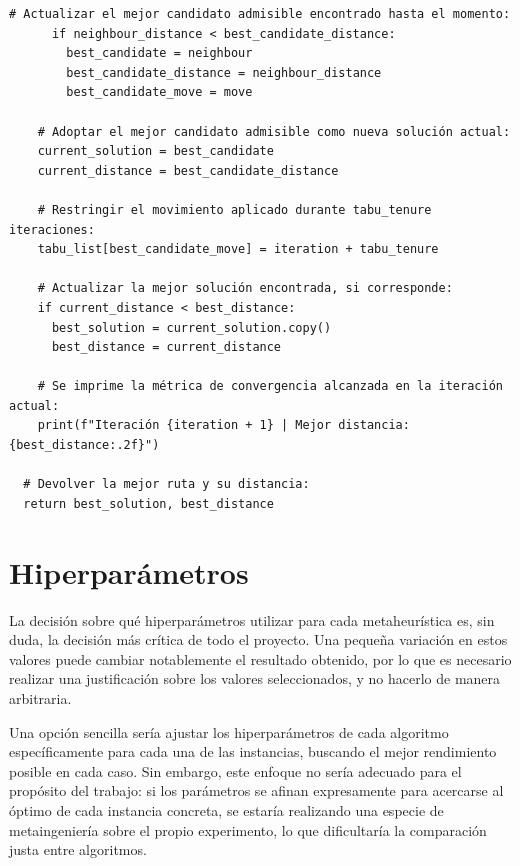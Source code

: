 \begin{lstlisting}[style=PythonStyle]
      # Actualizar el mejor candidato admisible encontrado hasta el momento:
      if neighbour_distance < best_candidate_distance:
        best_candidate = neighbour
        best_candidate_distance = neighbour_distance
        best_candidate_move = move

    # Adoptar el mejor candidato admisible como nueva solución actual:
    current_solution = best_candidate
    current_distance = best_candidate_distance

    # Restringir el movimiento aplicado durante tabu_tenure iteraciones:
    tabu_list[best_candidate_move] = iteration + tabu_tenure

    # Actualizar la mejor solución encontrada, si corresponde:
    if current_distance < best_distance:
      best_solution = current_solution.copy()
      best_distance = current_distance

    # Se imprime la métrica de convergencia alcanzada en la iteración actual:
    print(f"Iteración {iteration + 1} | Mejor distancia: {best_distance:.2f}")

  # Devolver la mejor ruta y su distancia:
  return best_solution, best_distance
\end{lstlisting}

\section{Hiperparámetros}
\label{sec:hyperparams}

La decisión sobre qué hiperparámetros utilizar para cada metaheurística es, sin duda, la decisión más crítica de todo el
proyecto. Una pequeña variación en estos valores puede cambiar notablemente el resultado obtenido, por lo que es 
necesario realizar una justificación sobre los valores seleccionados, y no hacerlo de manera arbitraria.

Una opción sencilla sería ajustar los hiperparámetros de cada algoritmo específicamente para cada una de las instancias,
buscando el mejor rendimiento posible en cada caso. Sin embargo, este enfoque no sería adecuado para el propósito del trabajo: 
si los parámetros se afinan expresamente para acercarse al óptimo de cada instancia concreta, se estaría realizando una especie
de metaingeniería sobre el propio experimento, lo que dificultaría la comparación justa entre algoritmos. 

